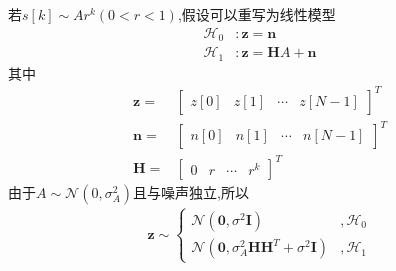\documentclass[fontset=windows]{article}
\numberwithin{figure}{section}
\begin{document}
若\(s[k]\sim Ar^k(0<r<1)\),假设可以重写为线性模型
\begin{align*}
	\mathcal{H}_0 & :\mathbf{z}=\mathbf{n}             \\
	\mathcal{H}_1 & :\mathbf{z}=\mathbf{H}A+\mathbf{n}
\end{align*}
其中
\begin{align*}
	\mathbf{z}=
	 & \begin{bmatrix}
		   z[0] & z[1] & \cdots & z[N-1]
	   \end{bmatrix}^T \\
	\mathbf{n}=
	 & \begin{bmatrix}
		   n[0] & n[1] & \cdots & n[N-1]
	   \end{bmatrix}^T \\
	\mathbf{H}=
	 & \begin{bmatrix}
		   0 & r & \cdots & r^k
	   \end{bmatrix}^T
\end{align*}
由于\(A\sim \mathcal{N}(0,\sigma^2_A)\)且与噪声独立,所以
\begin{align*}
	\mathbf{z}\sim\left\{
	\begin{matrix}
		\mathcal{N}(\mathbf{0},\sigma^2\mathbf{I})                         & ,\mathcal{H}_0 \\
		\mathcal{N}(\mathbf{0},\sigma^2_A\mathbf{HH}^T+\sigma^2\mathbf{I}) & ,\mathcal{H}_1
	\end{matrix}
	\right.
\end{align*}
\end{document}
